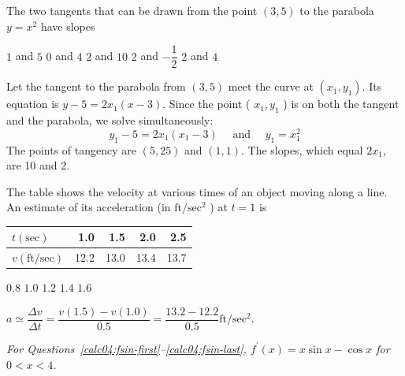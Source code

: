\newpage




\question
The two tangents that can be drawn from the point $(3,5)$ to the parabola $y=x^{2}$ have slopes
\begin{choices}
  \choice $1$ and $5$
  \choice $0$ and $4$
  \CorrectChoice $2$ and $10$
  \choice $2$ and $-\dfrac{1}{2}$
  \choice $2$ and $4$
\end{choices}
\begin{solution}
Let the tangent to the parabola from $(3,5)$ meet the curve at $\left(x_{1}, y_{1}\right)$. Its equation is $y-5=2 x_{1}(x-3)$. Since the point ( $x_{1}, y_{1}$ ) is on both the tangent and the parabola, we solve simultaneously:
\[
y_{1}-5=2 x_{1}\left(x_{1}-3\right) \quad \text { and } \quad y_{1}=x_{1}^{2}
\]
The points of tangency are $(5,25)$ and $(1,1)$. The slopes, which equal $2 x_{1}$, are 10 and 2.
\end{solution}

\question
The table shows the velocity at various times of an object moving along a line. An estimate of its acceleration (in $\mathrm{ft} / \mathrm{sec}^{2}$ ) at $t=1$ is

\begin{center}
\begin{tabular}{l|r|r|r|r}
$t(\mathrm{sec})$ & 1.0 & 1.5 & 2.0 & 2.5 \\
\hline
$v(\mathrm{ft} / \mathrm{sec})$ & 12.2 & 13.0 & 13.4 & 13.7 \\
\end{tabular}
\end{center}
\begin{choices}
  \choice $0.8$
  \choice $1.0$
  \choice $1.2$
  \choice $1.4$
  \CorrectChoice $1.6$
\end{choices}
\begin{solution}
$a \simeq \dfrac{\Delta v}{\Delta t}=\dfrac{v(1.5)-v(1.0)}{0.5}=\dfrac{13.2-12.2}{0.5} \mathrm{ft} / \mathrm{sec}^{2}$.
\end{solution}





\newpage




\begin{EnvFullwidth}
\textit{For Questions~\ref{calc04:fsin-first}--\ref{calc04:fsin-last}, $f^{\prime}(x)=x \sin x-\cos x$ for $0<x<4$.}
\end{EnvFullwidth}

